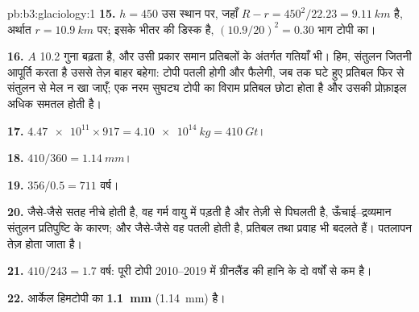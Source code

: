 \begin{solution}{pb:b3:glaciology:1}
\textbf{15.} $h = 450$ उस स्थान पर, जहाँ $R - r = 450^2/22.23 = \qty{9.11}{km}$ है, अर्थात
$r = \qty{10.9}{km}$ पर;  इसके भीतर की डिस्क है, $(10.9/
20)^2 = 0.30$ भाग टोपी का।

\textbf{16.} $A$ \num{10.2} गुना बढ़ता है, और उसी प्रकार समान प्रतिबलों के अंतर्गत गतियाँ भी।
हिम, संतुलन जितनी आपूर्ति करता है उससे तेज़ बाहर बहेगा: टोपी पतली होगी और फैलेगी,
जब तक घटे हुए प्रतिबल फिर से संतुलन से मेल न खा जाएँ;
एक नरम सुघट्य टोपी का विराम प्रतिबल छोटा होता है और
उसकी प्रोफ़ाइल अधिक समतल होती है।

\textbf{17.} $\num{4.47e11}\times917 = \qty{4.10e14}{kg} = \qty{410}{Gt}$।

\textbf{18.} $410/360 = \qty{1.14}{mm}$।

\textbf{19.} $356/0.5 = 711$ वर्ष।

\textbf{20.} जैसे-जैसे सतह नीचे होती है, वह गर्म वायु में पड़ती है और तेज़ी से पिघलती है,
ऊँचाई--द्रव्यमान संतुलन प्रतिपुष्टि के कारण; और जैसे-जैसे वह पतली होती है, प्रतिबल तथा
प्रवाह भी बदलते हैं। पतलापन तेज़ होता जाता है।

\textbf{21.} $410/243 = \num{1.7}\text{ वर्ष}$: पूरी टोपी 2010--2019 में ग्रीनलैंड
की हानि के दो वर्षों से कम है।

\textbf{22.} आर्केल हिमटोपी का 
\textbf{\qty[text-series-to-math=true]{1.1}{mm}} (\qty{1.14}{mm}) है।
\end{solution}
